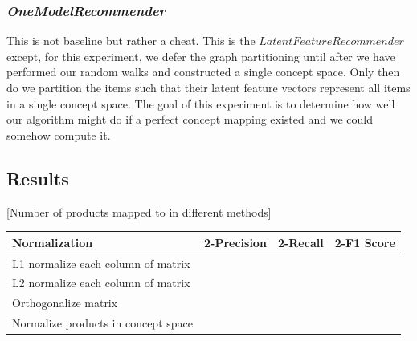 \documentclass[11pt]{article}
\begin{document}
\subsubsection*{\em OneModelRecommender}
This is not baseline but rather a cheat. This is the $LatentFeatureRecommender$
except, for this experiment, we defer the graph partitioning until after we have
performed our random walks and constructed a single concept space. Only then do
we partition the items such that their latent feature vectors represent all
items in a single concept space. The goal of this experiment is to determine how
well our algorithm might do if a perfect concept mapping existed and we could
somehow compute it.


\subsection*{Results}
[Number of products mapped to in different methods]
\begin{center}
\begin{tabular}{ | l | c | c | c |}
\hline
Normalization & 2-Precision & 2-Recall & 2-F1 Score \\ \hline\hline
L1 normalize each column of matrix &&&\\ \hline
L2 normalize each column of matrix &&&\\ \hline
Orthogonalize matrix &&&\\ \hline
Normalize products in concept space &&&\\ \hline
\end{tabular}
\end{center}
\end{document}
